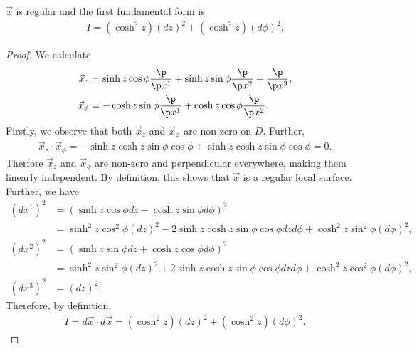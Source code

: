 \documentclass{article}
\begin{document}
\begin{claim*}
	$\vec x$ is regular and the first fundamental form is
	\begin{align*}
		I= (\cosh^2 z)(dz)^2 + (\cosh^2 z) (d\phi)^2.
	\end{align*}
\end{claim*}
\begin{proof}
	We calculate
	\begin{align}
		\label{dirderiv1}
		\vec x_z    & = \sinh z \cos\phi \frac{\p }{\p x^1}
		+ \sinh z \sin\phi \frac{\p }{\p x^2}
		+ \frac{\p }{\p x^3},                                \\
		\label{dirderiv2}
		\vec x_\phi & = -\cosh z \sin\phi \frac{\p }{\p x^1}
		+ \cosh z\cos\phi\frac{\p }{\p x^2}.
	\end{align}
	Firstly, we observe that both $\vec x_z$ and $\vec x_\phi$ are non-zero on $D$.
	Further,
	\begin{align*}
		\vec x_z \cdot \vec x_\phi = -\sinh z\cosh z\sin\phi\cos\phi + \sinh z\cosh z\sin\phi\cos\phi
		= 0.
	\end{align*}
	Therfore $\vec x_z$ and $\vec x_\phi$ are non-zero and perpendicular everywhere, making them linearly
	independent. By definition, this shows that $\vec x$ is a regular local surface.
	Further, we have
	\begin{align*}
		(dx^1)^2 & = (\sinh z\cos\phi dz - \cosh z \sin\phi d\phi)^2                                                     \\
		         & =\sinh^2 z \cos^2\phi(dz)^2
		-2\sinh z\cosh z\sin\phi\cos\phi dzd\phi+\cosh^2z\sin^2\phi(d\phi)^2,                                            \\
		(dx^2)^2 & = (\sinh z\sin\phi dz + \cosh z \cos\phi d\phi)^2                                                     \\
		         & =\sinh^2 z\sin^2\phi (dz)^2 + 2\sinh z\cosh z\sin\phi\cos\phi dzd\phi + \cosh^2 z\cos^2\phi(d\phi)^2, \\
		(dx^3)^2 & =(dz)^2.
	\end{align*}
	Therefore, by definition,
	\begin{align*}
		I=d\vec x\cdot d\vec x = (\cosh^2 z)(dz)^2 + (\cosh^2 z) (d\phi)^2.
	\end{align*}
\end{proof}
\end{document}

